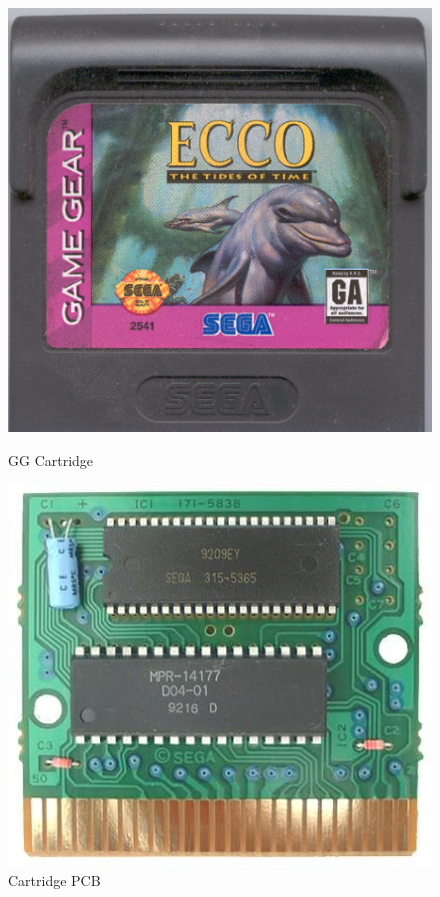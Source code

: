 \documentclass{article}
\begin{document}
\begin{figure}[!htbp]
    \centering
    \begin{minipage}[!htbp]{0.3\linewidth}
        \centering
        \includegraphics[width=\textwidth]{gg_cart.png}
        \caption{GG Cartridge\protect\cite{gg_cart}}
        \label{fig:gg_cart}
    \end{minipage}
    \hspace{1.5cm}
    \begin{minipage}[!htbp]{0.3\linewidth}
        \centering
        \includegraphics[width=\textwidth]{gg_cart_pcb.png}
        \caption{Cartridge PCB \protect\cite{gg_cart_pcb}}
        \label{fig:gg_cart_pcb}
    \end{minipage}
\end{figure}
\end{document}
